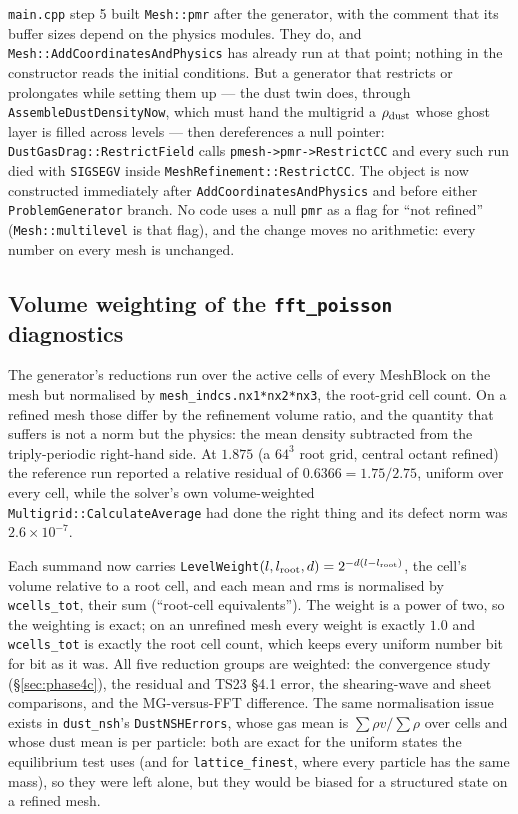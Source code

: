 \documentclass[11pt]{article}
\newcommand{\code}[1]{\texttt{#1}}
\newcommand{\file}[1]{\texttt{\small #1}}
\newcommand{\fn}[1]{\texttt{\small #1}}
\begin{document}
\file{main.cpp} step 5 built \code{Mesh::pmr} after the generator, with the comment that
its buffer sizes depend on the physics modules. They do, and
\fn{Mesh::AddCoordinatesAndPhysics} has already run at that point; nothing in the
constructor reads the initial conditions. But a generator that restricts or prolongates
while setting them up --- the dust twin does, through \fn{AssembleDustDensityNow}, which
must hand the multigrid a $\rho_{\rm dust}$ whose ghost layer is filled across levels ---
then dereferences a null pointer: \fn{DustGasDrag::RestrictField} calls
\code{pmesh->pmr->RestrictCC} and every such run died with \code{SIGSEGV} inside
\fn{MeshRefinement::RestrictCC}. The object is now constructed immediately after
\fn{AddCoordinatesAndPhysics} and before either \code{ProblemGenerator} branch. No code
uses a null \code{pmr} as a flag for ``not refined'' (\code{Mesh::multilevel} is that
flag), and the change moves no arithmetic: every number on every mesh is unchanged.

\subsection{Volume weighting of the \code{fft\_poisson} diagnostics}

The generator's reductions run over the active cells of every MeshBlock on the mesh but
normalised by \code{mesh\_indcs.nx1*nx2*nx3}, the root-grid cell count. On a refined mesh
those differ by the refinement volume ratio, and the quantity that suffers is not a norm
but the physics: the mean density subtracted from the triply-periodic right-hand side. At
$1.875$ (a $64^3$ root grid, central octant refined) the reference run reported a
relative residual of $0.6366 = 1.75/2.75$, uniform over every cell, while the solver's own
volume-weighted \fn{Multigrid::CalculateAverage} had done the right thing and its defect
norm was $2.6\times10^{-7}$.

Each summand now carries \fn{LevelWeight}$(l, l_{\rm root}, d) = 2^{-d(l-l_{\rm root})}$,
the cell's volume relative to a root cell, and each mean and rms is normalised by
\code{wcells\_tot}, their sum (``root-cell equivalents''). The weight is a power of two,
so the weighting is exact; on an unrefined mesh every weight is exactly $1.0$ and
\code{wcells\_tot} is exactly the root cell count, which keeps every uniform number bit
for bit as it was. All five reduction groups are weighted: the convergence study
(\S\ref{sec:phase4c}), the residual and TS23 \S4.1 error, the shearing-wave and sheet
comparisons, and the MG-versus-FFT difference. The same normalisation issue exists in
\code{dust\_nsh}'s \fn{DustNSHErrors}, whose gas mean is $\sum\rho v/\sum\rho$ over cells
and whose dust mean is per particle: both are exact for the uniform states the equilibrium
test uses (and for \code{lattice\_finest}, where every particle has the same mass), so
they were left alone, but they would be biased for a structured state on a refined mesh.
\end{document}
